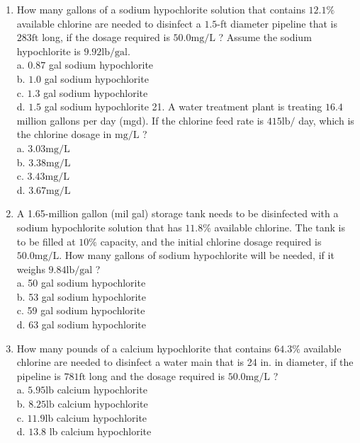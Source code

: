 \documentclass[10pt]{article}
\begin{document}
\begin{enumerate}
  \item How many gallons of a sodium hypochlorite solution that contains $12.1 \%$ available chlorine are needed to disinfect a $1.5$-ft diameter pipeline that is $283 \mathrm{ft}$ long, if the dosage required is $50.0 \mathrm{mg} / \mathrm{L}$ ? Assume the sodium hypochlorite is $9.92 \mathrm{lb} / \mathrm{gal}$.\\
a. $0.87$ gal sodium hypochlorite\\
b. $1.0$ gal sodium hypochlorite\\
c. $1.3$ gal sodium hypochlorite\\
d. $1.5$ gal sodium hypochlorite 21. A water treatment plant is treating $16.4$ million gallons per day (mgd). If the chlorine feed rate is $415 \mathrm{lb} /$ day, which is the chlorine dosage in $\mathrm{mg} / \mathrm{L}$ ?\\
a. $3.03 \mathrm{mg} / \mathrm{L}$\\
b. $3.38 \mathrm{mg} / \mathrm{L}$\\
c. $3.43 \mathrm{mg} / \mathrm{L}$\\
d. $3.67 \mathrm{mg} / \mathrm{L}$

  \item A 1.65-million gallon (mil gal) storage tank needs to be disinfected with a sodium hypochlorite solution that has $11.8 \%$ available chlorine. The tank is to be filled at $10 \%$ capacity, and the initial chlorine dosage required is $50.0 \mathrm{mg} / \mathrm{L}$. How many gallons of sodium hypochlorite will be needed, if it weighs $9.84 \mathrm{lb} / \mathrm{gal}$ ?\\
a. 50 gal sodium hypochlorite\\
b. 53 gal sodium hypochlorite\\
c. 59 gal sodium hypochlorite\\
d. 63 gal sodium hypochlorite

  \item How many pounds of a calcium hypochlorite that contains $64.3 \%$ available chlorine are needed to disinfect a water main that is 24 in. in diameter, if the pipeline is $781 \mathrm{ft}$ long and the dosage required is $50.0 \mathrm{mg} / \mathrm{L}$ ?\\
a. $5.95 \mathrm{lb}$ calcium hypochlorite\\
b. $8.25 \mathrm{lb}$ calcium hypochlorite\\
c. $11.9 \mathrm{lb}$ calcium hypochlorite\\
d. $13.8$ lb calcium hypochlorite


\end{enumerate}
\end{document}
